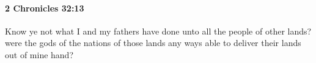 
		\paragraph{2 Chronicles 32:13} %
			\label{2CHRONICLES-32-13}

			Know ye not what I and my fathers have done unto all the people of other lands? were the gods of the nations of those lands any ways able to deliver their lands out of mine hand?


